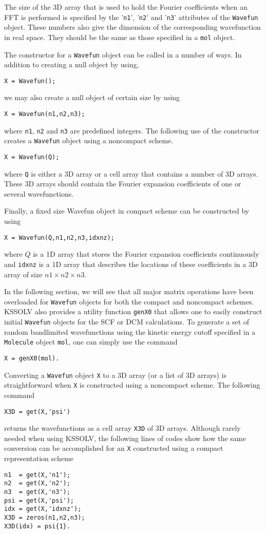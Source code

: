 \documentclass[11pt]{book}
\begin{document}
The size of the 3D array that is used to hold the Fourier coefficients
when an FFT is performed is specified by the '{\tt n1}', '{\tt n2}' and 
'{\tt n3}' attributes of the {\tt Wavefun} object.  These numbers also 
give the dimension of the corresponding wavefunction in real space.  
They should be the same as those specified in a {\tt mol} object.

The constructor for a {\tt Wavefun} object can be called in a number of
ways.  In addition to creating a null object by using,
\begin{verbatim}
X = Wavefun();
\end{verbatim}
we may also create a null object of certain size by using
\begin{verbatim}
X = Wavefun(n1,n2,n3);
\end{verbatim}
where {\tt n1}, {\tt n2} and {\tt n3} are predefined integers.
The following use of the constructor creates a {\tt Wavefun} object
using a noncompact scheme.
\begin{verbatim}
X = Wavefun(Q);
\end{verbatim}
where {\tt Q} is either a 3D array or a cell array that contains a
number of 3D arrays. These 3D arrays should contain the Fourier 
expansion coefficients of one or several wavefunctions.

Finally, a fixed size Wavefun object in compact scheme can be constructed by
using
\begin{verbatim}
X = Wavefun(Q,n1,n2,n3,idxnz);
\end{verbatim}
where $Q$ is a 1D array that stores the Fourier expansion coefficients
continuously and {\tt idxnz} is a 1D array that describes the locations
of these coefficients in a 3D array of size $n1 \times n2 \times n3$.

In the following section, we will see that all major matrix operations 
have been overloaded for {\tt Wavefun} objects for both the compact and
noncompact schemes.  KSSOLV also provides a utility function {\tt genX0}
that allows one to easily construct initial {\tt Wavefun} objects for the 
SCF or DCM calculations. To generate a set of random bandlimited 
wavefunctions using the kinetic energy cutoff specified in a 
{\tt Molecule} object {\tt mol}, one can simply use the command
\begin{verbatim}
X = genX0(mol).
\end{verbatim}

Converting a {\tt Wavefun} object {\tt X} to a 3D array (or a list of 3D
arrays) is straightforward when {\tt X} is constructed using a noncompact 
scheme. The following command
\begin{verbatim}
X3D = get(X,'psi')
\end{verbatim}
returns the wavefunctions as a cell array {\tt X3D} of 3D arrays. 
Although rarely needed when using KSSOLV, the following lines of codes show
how the same conversion can be accomplished for an {\tt X} constructed
using a compact representation scheme
\begin{verbatim}
n1  = get(X,'n1');
n2  = get(X,'n2');
n3  = get(X,'n3');
psi = get(X,'psi');
idx = get(X,'idxnz');
X3D = zeros(n1,n2,n3);
X3D(idx) = psi{1}.
\end{verbatim}
\end{document}
